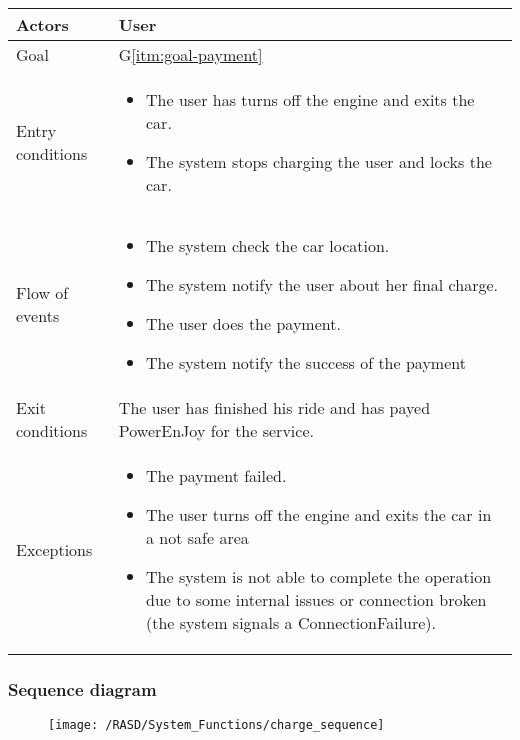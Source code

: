 \begin{center}
  \begin{tabular}{ l | p{10cm} }
    \hline
    Actors & User\\ \hline
    Goal & G\ref{itm:goal-payment}\\ \hline
    Entry conditions & 
    \begin{itemize}
    \item The user has turns off the engine and exits the car.
    \item The system stops charging the user and locks the car.
    \end{itemize} \\ \hline
    Flow of events &
\begin{itemize}
\item The system check the car location.
\item The system notify the user about her final charge.
\item The user does the payment.
\item The system notify the success of the payment
\end{itemize} \\ \hline
    Exit conditions & The user has finished his ride and has payed PowerEnJoy for the service. \\ \hline
  Exceptions & 
\begin{itemize}
\item The payment failed.
\item The user turns off the engine and exits the car in a not safe area
\item The system is not able to complete the operation due to some internal issues or connection broken (the system signals a ConnectionFailure).%
\end{itemize} \\ \hline
  \end{tabular}
\end{center}


\subsubsection{Sequence diagram}
\begin{figure}[!ht]
  \centering
  \vspace{0.1cm}
  \texttt{[image: /RASD/System\_Functions/charge\_sequence]}\\
  \vspace{0.1cm}
  \label{fig:charge_sequence} 
\end{figure}

